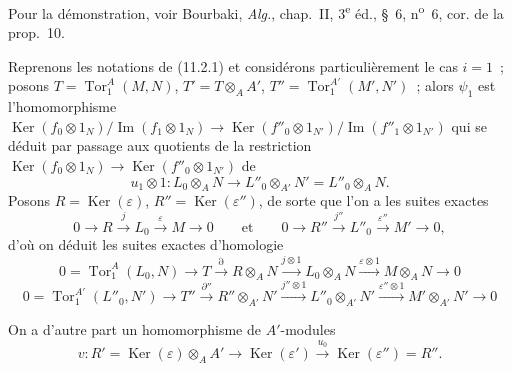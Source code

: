 Pour la démonstration, voir Bourbaki, \emph{Alg.}, chap.~II, 3\textsuperscript{e} éd.,
\S~6, n\textsuperscript{o}~6, cor. de la prop.~10.

\begin{env}[11.2.3]
\label{IV.11.2.3-fr}
Reprenons les notations de (11.2.1) et considérons particulièrement le cas
$i=1$~; posons $T=\operatorname{Tor}_1^A(M,N)$, $T'=T\otimes_AA'$,
$T''=\operatorname{Tor}_1^{A'}(M',N')$~; alors $\psi_1$ est
l'homomorphisme
$\operatorname{Ker}(f_0\otimes1_N)/\operatorname{Im}(f_1\otimes1_N)
\to
\operatorname{Ker}(f''_0\otimes1_{N'})/
\operatorname{Im}(f''_1\otimes1_{N'})$
qui se déduit par passage aux quotients de la restriction
$\operatorname{Ker}(f_0\otimes1_N)\to
\operatorname{Ker}(f''_0\otimes1_{N'})$ de
\[
u_1\otimes1:L_0\otimes_AN\to L''_0\otimes_{A'}N'=L''_0\otimes_AN.
\]
Posons $R=\operatorname{Ker}(\varepsilon)$,
$R''=\operatorname{Ker}(\varepsilon'')$, de sorte que l'on a les suites
exactes
\[
0\to R\xrightarrow{j}L_0\xrightarrow{\varepsilon}M\to0
\qquad\text{et}\qquad
0\to R''\xrightarrow{j''}L''_0\xrightarrow{\varepsilon''}M'\to0,
\]
d'où on déduit les suites exactes d'homologie
\begin{equation}
0=\operatorname{Tor}_1^A(L_0,N)\to T\xrightarrow{\partial}R\otimes_AN
\xrightarrow{j\otimes1}L_0\otimes_AN\xrightarrow{\varepsilon\otimes1}
M\otimes_AN\to0
\label{IV.11.2.3.1-fr}
\tag{11.2.3.1}
\end{equation}
\begin{equation}
0=\operatorname{Tor}_1^{A'}(L''_0,N')\to T''\xrightarrow{\partial''}
R''\otimes_{A'}N'\xrightarrow{j''\otimes1}L''_0\otimes_{A'}N'
\xrightarrow{\varepsilon''\otimes1}M'\otimes_{A'}N'\to0
\label{IV.11.2.3.2-fr}
\tag{11.2.3.2}
\end{equation}

On a d'autre part un homomorphisme de $A'$-modules
\[
v:R'=\operatorname{Ker}(\varepsilon)\otimes_AA'
\to\operatorname{Ker}(\varepsilon')\xrightarrow{u_0}
\operatorname{Ker}(\varepsilon'')=R''.
\]
\end{env}


